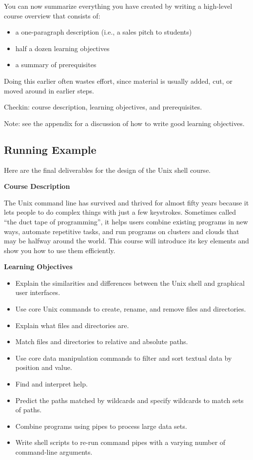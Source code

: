 \documentclass[10pt,statementpaper]{memoir}
\providecommand{\tightlist}{%
  \setlength{\itemsep}{0pt}\setlength{\parskip}{0pt}}
\begin{document}
You can now summarize everything you have created by writing a
high-level course overview that consists of:

\begin{itemize}
\tightlist
\item
  a one-paragraph description (i.e., a sales pitch to students)
\item
  half a dozen learning objectives
\item
  a summary of prerequisites
\end{itemize}

Doing this earlier often wastes effort, since material is usually added,
cut, or moved around in earlier steps.

Checkin: course description, learning objectives, and prerequisites.

Note: see the appendix for a discussion of how to write good learning
objectives.

\subsection*{Running Example}\label{running-example-4}

Here are the final deliverables for the design of the Unix shell course.

\textbf{Course Description}

The Unix command line has survived and thrived for almost fifty years
because it lets people to do complex things with just a few keystrokes.
Sometimes called ``the duct tape of programming'', it helps users
combine existing programs in new ways, automate repetitive tasks, and
run programs on clusters and clouds that may be halfway around the
world. This course will introduce its key elements and show you how to
use them efficiently.

\textbf{Learning Objectives}

\begin{itemize}
\item
  Explain the similarities and differences between the Unix shell and
  graphical user interfaces.
\item
  Use core Unix commands to create, rename, and remove files and
  directories.
\item
  Explain what files and directories are.
\item
  Match files and directories to relative and absolute paths.
\item
  Use core data manipulation commands to filter and sort textual data by
  position and value.
\item
  Find and interpret help.
\item
  Predict the paths matched by wildcards and specify wildcards to match
  sets of paths.
\item
  Combine programs using pipes to process large data sets.
\item
  Write shell scripts to re-run command pipes with a varying number of
  command-line arguments.
\end{itemize}
\end{document}
